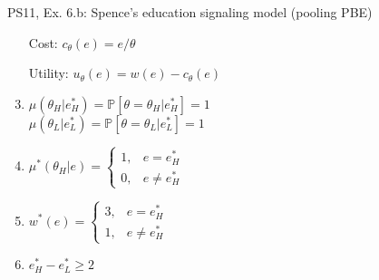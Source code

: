 \begin{frame}{PS11, Ex. 6.b: Spence’s education signaling model (pooling PBE)}
\begin{multicols}{2}
\begin{enumerate}
        \item[Cost:] \vspace{-2pt}$c_\theta(e)=e/\theta$
        \item[Utility:] \vspace{-2pt}$u_\theta(e)=w(e)-c_\theta(e)$
        \item \vspace{-2pt}$\mu\left(\theta_H|e_H^*\right)=
               \mathbb{P}\left[\theta=\theta_H|e_H^*\right]=1$\\
              $\mu\left(\theta_L|e_L^*\right)=
               \mathbb{P}\left[\theta=\theta_L|e_L^*\right]=1$
        \item \vspace{-2pt}$\mu^*(\theta_H|e)=\left\{\begin{array}{ll}
                  1, & e = e_H^* \\
                  0, & e \neq e_H^*
               \end{array}\right.$
        \item \vspace{-2pt}$w^*(e)=\left\{\begin{array}{ll}
                  3, & e = e_H^* \\
                  1, & e \neq e_H^*
               \end{array}\right.$
        \item \vspace{-2pt}$e_H^*-e_L^*\geq2$
      \end{enumerate}
    \end{multicols}
    \vfill\null
\end{frame}
